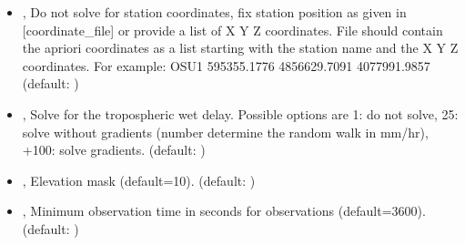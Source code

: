 \documentclass[letterpaper,10pt,english]{sphinxmanual}
\begin{document}
\begin{itemize}
\item {} 
\sphinxAtStartPar
{\hyperref[\detokenize{com:LocateRinex.py--fix}]{}} , {\hyperref[\detokenize{com:LocateRinex.py---fix_coordinate}]{}}  \sphinxhyphen{} Do not solve for station coordinates, fix station position as given in {[}coordinate\_file{]} or provide a list of X Y Z coordinates. File should contain the apriori coordinates as a list starting with the station name and the X Y Z coordinates. For example: OSU1  595355.1776 \sphinxhyphen{}4856629.7091  4077991.9857 (default: )

\item {} 
\sphinxAtStartPar
{\hyperref[\detokenize{com:LocateRinex.py--st}]{}} , {\hyperref[\detokenize{com:LocateRinex.py---solve_troposphere}]{}}  \sphinxhyphen{} Solve for the tropospheric wet delay. Possible options are 1: do not solve, 2\sphinxhyphen{}5: solve without gradients (number determine the random walk in mm/hr), +100: solve gradients. (default: )

\item {} 
\sphinxAtStartPar
{\hyperref[\detokenize{com:LocateRinex.py--elv}]{}} , {\hyperref[\detokenize{com:LocateRinex.py---elevation_mask}]{}}  \sphinxhyphen{} Elevation mask (default=10). (default: )

\item {} 
\sphinxAtStartPar
{\hyperref[\detokenize{com:LocateRinex.py--min}]{}} , {\hyperref[\detokenize{com:LocateRinex.py---min_time_seconds}]{}}  \sphinxhyphen{} Minimum observation time in seconds for observations (default=3600). (default: )


\end{itemize}
\end{document}

